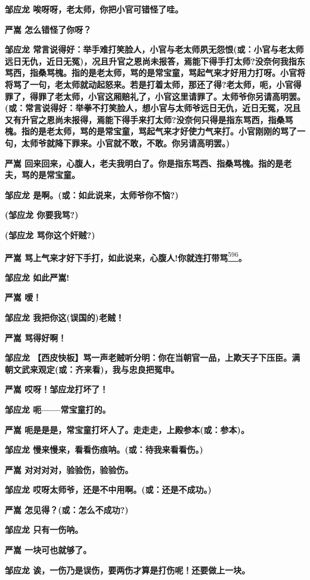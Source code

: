\textbf{邹应龙 唉呀呀，老太师，你把小官可错怪了哇。}

\textbf{严嵩 怎么错怪了你呀？}

\textbf{邹应龙
常言说得好：举手难打笑脸人，小官与老太师夙无怨恨(或：小官与老太师远日无仇，近日无冤)，况且升官之恩尚未报答，焉能下得手打太师?没奈何我指东骂西，指桑骂槐。指的是老太师，骂的是常宝童，骂起气来才好用力打呀。小官将将骂了一句，老太师就动起怒来。若是打着太师，那还了得?老太师，呃，小官得罪了，得罪了老太师，小官这厢赔礼了，小官这里请罪了。太师爷你另请高明罢。(或：常言说得好：举拳不打笑脸人，想小官与太师爷远日无仇，近日无冤，况且又有升官之恩尚未报得，焉能下得手来打太师?没奈何只得是指东骂西，指桑骂槐。指的是老太师，骂的是常宝童，骂起气来才好使力气来打。小官刚刚的骂了一句，太师爷就降下罪来。小官就不敢，不敢。你另请高明罢。)}

\textbf{严嵩
回来回来，心腹人，老夫我明白了。你是指东骂西、指桑骂槐。指的是老夫，骂的是常宝童。}

\textbf{邹应龙 是啊。(或：如此说来，太师爷你不恼?)}

\textbf{(邹应龙 你要我骂?)}

\textbf{(邹应龙 骂你这个奸贼?)}

\textbf{严嵩
骂上气来才好下手打，如此说来，心腹人!你就连打带骂}\protect\hyperlink{fn596}{\textsuperscript{596}}\textbf{。}

\textbf{邹应龙 如此严嵩!}

\textbf{严嵩 嗳！}

\textbf{邹应龙 我把你这(误国的)老贼！}

\textbf{严嵩 骂得好啊！}

\textbf{邹应龙
【西皮快板】骂一声老贼听分明：你在当朝官一品，上欺天子下压臣。满朝文武来观定(或：齐来看)，我与忠良把冤申。}

\textbf{严嵩 哎呀！邹应龙打坏了！}

\textbf{邹应龙 呃------常宝童打的。}

\textbf{严嵩 呃是是是，常宝童打坏人了。走走走，上殿参本(或：参本)。}

\textbf{邹应龙 慢来慢来，看看伤痕呐。(或：待我来看看伤。)}

\textbf{严嵩 对对对对，验验伤，验验伤。}

\textbf{邹应龙 哎呀太师爷，还是不中用啊。(或：还是不成功。)}

\textbf{严嵩 怎见得？(或：怎么不成功?)}

\textbf{邹应龙 只有一伤呐。}

\textbf{严嵩 一块可也就够了。}

\textbf{邹应龙 诶，一伤乃是误伤，要两伤才算是打伤呢！还要做上一块。}

